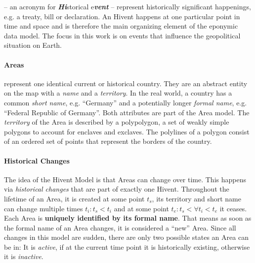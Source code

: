 -- an acronym for \emph{\textbf{Hi}}storical e\emph{\textbf{vent}} --
represent historically significant happenings, e.g. a treaty, bill or declaration.
An Hivent happens at one particular point in time and space and is therefore the main organizing element of the eponymic data model.
The focus in this work is on events that influence the geopolitical situation on Earth.


\vspace{-1em}
\paragraph{Areas} %
\label{par:area}

represent one identical current or historical country. They are an abstract entity on the map with a \emph{name} and a \emph{territory}. In the real world, a country has a common \emph{short name}, e.g. ``Germany'' and a potentially longer \emph{formal name}, e.g. ``Federal Republic of Germany''. Both attributes are part of the Area model. The \emph{territory} of the Area is described by a polypolygon, a set of weakly simple polygons to account for enclaves and exclaves. The polylines of a polygon consist of an ordered set of points that represent the borders of the country.


\vspace{-1em}
\paragraph{Historical Changes} %
\label{par:historical_changes}

The idea of the Hivent Model is that Areas can change over time. This happens via \emph{historical changes} that are part of exactly one Hivent. Throughout the lifetime of an Area, it is created at some point $t_s$, its territory and short name can change multiple times $t_i: t_s < t_i$ and at some point $t_e: t_s < \forall t_i < t_e$ it ceases.
Each Area is \textbf{uniquely identified by its formal name}. That means as soon as the formal name of an Area changes, it is considered a ``new'' Area.
Since all changes in this model are sudden, there are only two possible states an Area can be in: It is \emph{active}, if at the current time point it is historically existing, otherwise it is \emph{inactive}.

